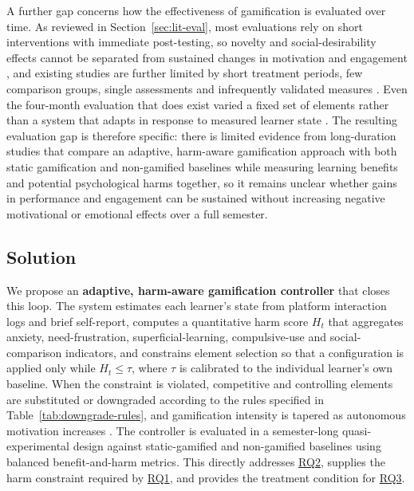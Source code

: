 \documentclass[12pt,a4paper]{article}
\DeclareRobustCommand{\rqlink}[1]{\texorpdfstring{\hyperref[rq:rq#1]{RQ#1}}{RQ#1}}
\begin{document}
\begin{justify}
A further gap concerns how the effectiveness of gamification is evaluated over time.
As reviewed in Section~\ref{sec:lit-eval}, most evaluations rely on short
interventions with immediate post-testing, so novelty and social-desirability effects
cannot be separated from sustained changes in motivation and engagement
\parencite{zhang2026gamification,ming2025gamification}, and existing studies are
further limited by short treatment periods, few comparison groups, single assessments
and infrequently validated measures \parencite{ojonuba2025web}. Even the four-month
evaluation that does exist varied a fixed set of elements rather than a system that
adapts in response to measured learner state \parencite{durmaz2022gamification}. The
resulting evaluation gap is therefore specific: there is limited evidence from
long-duration studies that compare an adaptive, harm-aware gamification approach with
both static gamification and non-gamified baselines while measuring learning benefits
and potential psychological harms together, so it remains unclear whether gains in
performance and engagement can be sustained without increasing negative motivational
or emotional effects over a full semester.

\subsection{Solution}

We propose an \textbf{adaptive, harm-aware gamification controller} that closes this loop. The system estimates each learner's state from platform interaction logs and brief self-report, computes a quantitative harm score $H_t$ that aggregates anxiety, need-frustration, superficial-learning, compulsive-use and social-comparison indicators, and constrains element selection so that a configuration is applied only while $H_t \le \tau$, where $\tau$ is calibrated to the individual learner's own baseline. When the constraint is violated, competitive and controlling elements are substituted or downgraded according to the rules specified in Table~\ref{tab:downgrade-rules}, and gamification intensity is tapered as autonomous motivation increases \parencite{gao2024sdt}. The controller is evaluated in a semester-long quasi-experimental design against static-gamified and non-gamified baselines using balanced benefit-and-harm metrics. This directly addresses \rqlink{2}, supplies the harm constraint required by \rqlink{1}, and provides the treatment condition for \rqlink{3}.


\end{justify}
\end{document}
